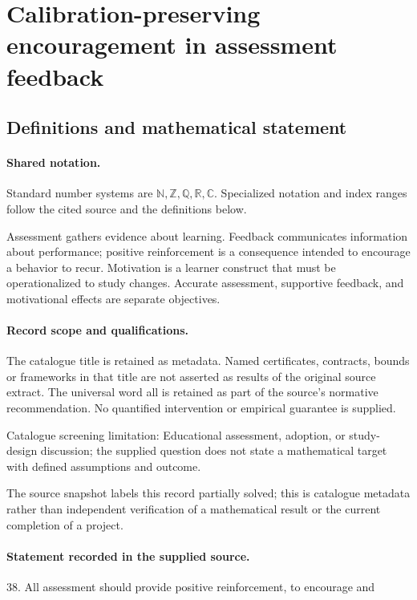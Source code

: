 \documentclass[11pt]{article}
\begin{document}
\section{Calibration-preserving encouragement in assessment feedback}\label{statement}

\subsection{Definitions and mathematical statement}

\paragraph{Shared notation.}Standard number systems are $\mathbb N,\mathbb Z,\mathbb Q,\mathbb R,\mathbb C$. Specialized notation and index ranges follow the cited source and the definitions below.


Assessment gathers evidence about learning. Feedback communicates information about performance; positive reinforcement is a consequence intended to encourage a behavior to recur. Motivation is a learner construct that must be operationalized to study changes. Accurate assessment, supportive feedback, and motivational effects are separate objectives.
\paragraph{Record scope and qualifications.}
The catalogue title is retained as metadata. Named certificates, contracts, bounds or frameworks in that title are not asserted as results of the original source extract.
The universal word all is retained as part of the source's normative recommendation. No quantified intervention or empirical guarantee is supplied.

Catalogue screening limitation: Educational assessment, adoption, or study-design discussion; the supplied question does not state a mathematical target with defined assumptions and outcome.

The source snapshot labels this record partially solved; this is catalogue metadata rather than independent verification of a mathematical result or the current completion of a project.
\paragraph{Statement recorded in the supplied source.}
38. All assessment should provide positive reinforcement, to encourage and
\end{document}
